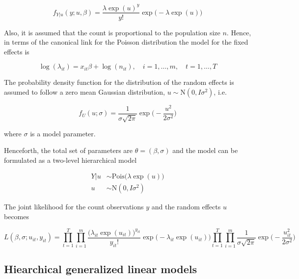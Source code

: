 \documentclass[preprint, 3p,
authoryear]{elsarticle} %
\begin{document}
\begin{equation}
  f_{Y|u}(y; u, \beta)=\frac{\lambda\exp(u)^{y}}{y!}\exp\big(-\lambda\exp(u)\big)
\end{equation}

Also, it is assumed that the count is proportional to the population
size \(n\). Hence, in terms of the canonical link for the Poisson
distribution the model for the fixed effects is

\begin{equation}
\log(\lambda_{it})= x_{it} \beta + \log(n_{it}), \quad i=1,\dots,m, \quad t=1,\dots,T
\end{equation}

The probability density function for the distribution of the random
effects is assumed to follow a zero mean Gaussian distribution,
\(u\sim\mathrm{N}(0,I\sigma^2)\), i.e.

\begin{equation}
  f_U(u;\sigma)=\frac{1}{\sigma\sqrt{2\pi}}\exp\Bigg(-\frac{u^2}{2\sigma^2}\Bigg)
\end{equation}

where \(\sigma\) is a model parameter.

Henceforth, the total set of parameters are \(\theta=(\beta,\sigma)\)
and the model can be formulated as a two-level hierarchical model

\begin{subequations} \label{eq:PoisN}
  \begin{alignat}{2}
    {Y|u} &\sim \mathrm{Pois} \big( \lambda \exp(u) \big) \label{eq:pois_n0} \\ 
    {u} &\sim \mathrm{N}({0},I\sigma^2) \label{eq:pois_n1}
  \end{alignat}
\end{subequations}

The joint likelihood for the count observations \(y\) and the random
effects \(u\) becomes

\begin{equation}\label{eq:jnllPoisN}
  L(\beta, \sigma;u_{it},y_{it})=\prod_{t=1}^{T}\prod_{i=1}^{m} \frac{\big(\lambda_{it}\exp(u_{it})\big)^{y_{it}}}{y_{it}!}\exp\big(-\lambda_{it}\exp(u_{it})\big) \prod_{t=1}^{T}\prod_{i=1}^{m} \frac{1}{\sigma\sqrt{2\pi}}\exp\Bigg(-\frac{u_{it}^2}{2\sigma^2}\Bigg)
\end{equation}

\hypertarget{hiearchical-generalized-linear-models}{%
\subsection{\texorpdfstring{Hiearchical generalized linear models
\label{hglm}}{Hiearchical generalized linear models }}\label{hiearchical-generalized-linear-models}}
\end{document}
